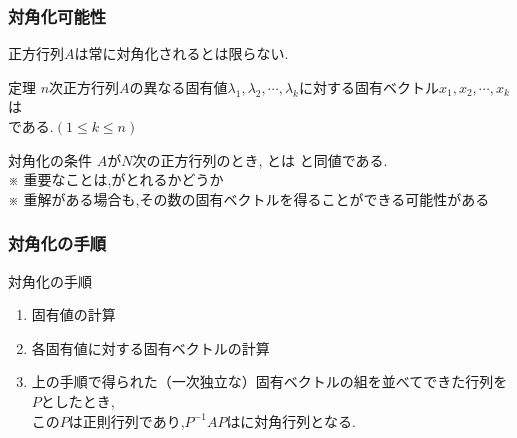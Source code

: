 \documentclass[a4paper]{jsarticle}
\begin{document}
\subsubsection{対角化可能性}
正方行列$A$は常に対角化されるとは限らない.
\begin{itembox}[l]{定理}
    $n$次正方行列$A$の異なる固有値$\lambda_1,\lambda_2,\cdots,\lambda_k$に対する固有ベクトル$x_1,x_2,\cdots,x_k$は\\
    である.$\left(1\leq k\leq n\right)$
\end{itembox}
\begin{itembox}[l]{対角化の条件}
    $A$が$N$次の正方行列のとき, とは
    と同値である.\\
    ※ 重要なことは,がとれるかどうか\\
    ※ 重解がある場合も,その数の固有ベクトルを得ることができる可能性がある
\end{itembox}
\subsubsection{対角化の手順}
\begin{itembox}[l]{対角化の手順}
    \begin{enumerate}[(1)]
        \item 固有値の計算
        \item 各固有値に対する固有ベクトルの計算
        \item 上の手順で得られた（一次独立な）固有ベクトルの組を並べてできた行列を$P$としたとき,\\
              この$P$は正則行列であり,$P^{-1}AP$はに対角行列となる.
    \end{enumerate}
\end{itembox}
\end{document}
